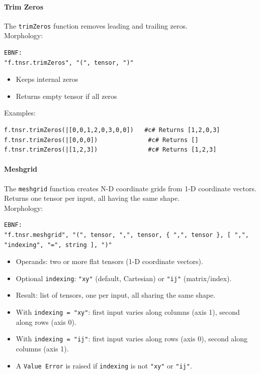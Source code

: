 \paragraph{Trim Zeros}
The \texttt{trimZeros} function removes leading and trailing zeros.\\
Morphology:
\begin{verbatim}
EBNF:
"f.tnsr.trimZeros", "(", tensor, ")"
\end{verbatim}
\begin{itemize}
\item Keeps internal zeros
\item Returns empty tensor if all zeros
\end{itemize}
Examples:
\begin{verbatim}
f.tnsr.trimZeros(|[0,0,1,2,0,3,0,0])   #c# Returns [1,2,0,3]
f.tnsr.trimZeros(|[0,0,0])              #c# Returns []
f.tnsr.trimZeros(|[1,2,3])              #c# Returns [1,2,3]
\end{verbatim}

\paragraph{Meshgrid}
The \texttt{meshgrid} function creates N-D coordinate grids from 1-D coordinate vectors. Returns one tensor per input, all having the same shape. \\ Morphology:
\begin{verbatim}
EBNF:
"f.tnsr.meshgrid", "(", tensor, ",", tensor, { ",", tensor }, [ ",", "indexing", "=", string ], ")"
\end{verbatim}
\begin{itemize}
\item Operands: two or more flat tensors (1-D coordinate vectors).
\item Optional \texttt{indexing}: \texttt{"xy"} (default, Cartesian) or \texttt{"ij"} (matrix/index).
\item Result: list of tensors, one per input, all sharing the same shape.
\item With \texttt{indexing = "xy"}: first input varies along columns (axis 1), second along rows (axis 0).
\item With \texttt{indexing = "ij"}: first input varies along rows (axis 0), second along columns (axis 1).
\item A \texttt{Value Error} is raised if \texttt{indexing} is not \texttt{"xy"} or \texttt{"ij"}.
\end{itemize}

